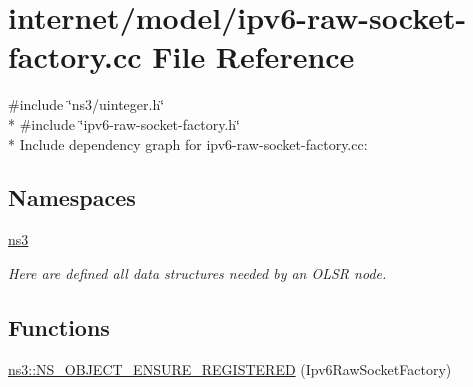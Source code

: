 \hypertarget{ipv6-raw-socket-factory_8cc}{}\section{internet/model/ipv6-\/raw-\/socket-\/factory.cc File Reference}
\label{ipv6-raw-socket-factory_8cc}
{\ttfamily \#include \char`\"{}ns3/uinteger.\+h\char`\"{}}\\*
{\ttfamily \#include \char`\"{}ipv6-\/raw-\/socket-\/factory.\+h\char`\"{}}\\*
Include dependency graph for ipv6-\/raw-\/socket-\/factory.cc\+:
\subsection*{Namespaces}
\begin{DoxyCompactItemize}
\item 
 \hyperlink{namespacens3}{ns3}
\begin{DoxyCompactList}\small\item\em Here are defined all data structures needed by an O\+L\+SR node. \end{DoxyCompactList}\end{DoxyCompactItemize}
\subsection*{Functions}
\begin{DoxyCompactItemize}
\item 
\hyperlink{namespacens3_a405f7344976c6b29d1a95ed692a76c63}{ns3\+::\+N\+S\+\_\+\+O\+B\+J\+E\+C\+T\+\_\+\+E\+N\+S\+U\+R\+E\+\_\+\+R\+E\+G\+I\+S\+T\+E\+R\+ED} (Ipv6\+Raw\+Socket\+Factory)
\end{DoxyCompactItemize}
